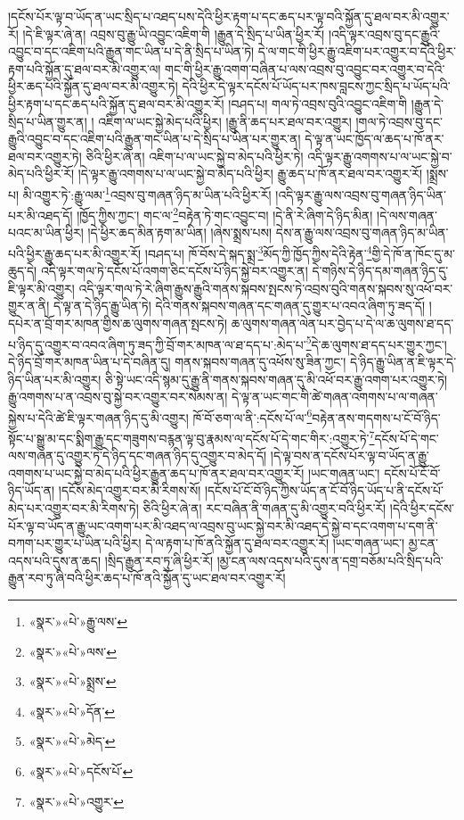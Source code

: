 །དངོས་པོར་ལྟ་བ་ཡོད་ན་ཡང་སྲིད་པ་འཐད་པས་དེའི་ཕྱིར་རྟག་པ་དང་ཆད་པར་ལྟ་བའི་སྐྱོན་དུ་ཐལ་བར་མི་འགྱུར་རོ། །དེ་ཇི་ལྟར་ཞེ་ན། འབྲས་བུ་རྒྱུ་ཡི་འབྱུང་འཇིག་གི །རྒྱུན་དེ་སྲིད་པ་ཡིན་ཕྱིར་རོ། །འདི་ལྟར་འབྲས་བུ་དང་རྒྱུའི་འབྱུང་བ་དང་འཇིག་པའི་རྒྱུན་གང་ཡིན་པ་དེ་ནི་སྲིད་པ་ཡིན་ཏེ། དེ་ལ་གང་གི་ཕྱིར་རྒྱུ་འཇིག་པར་འགྱུར་བ་དེའི་ཕྱིར་རྟག་པའི་སྐྱོན་དུ་ཐལ་བར་མི་འགྱུར་ལ། གང་གི་ཕྱིར་རྒྱུ་འགག་བཞིན་པ་ལས་འབྲས་བུ་འབྱུང་བར་འགྱུར་བ་དེའི་ཕྱིར་ཆད་པའི་སྐྱོན་དུ་ཐལ་བར་མི་འགྱུར་ཏེ། དེའི་ཕྱིར་དེ་ལྟར་དངོས་པོ་ཡོད་པར་ཁས་བླངས་ཀྱང་སྲིད་པ་ཡོད་པའི་ཕྱིར་རྟག་པ་དང་ཆད་པའི་སྐྱོན་དུ་ཐལ་བར་མི་འགྱུར་རོ། །བཤད་པ། གལ་ཏེ་འབྲས་བུའི་འབྱུང་འཇིག་གི །རྒྱུན་དེ་སྲིད་པ་ཡིན་གྱུར་ན། །
འཇིག་ལ་ཡང་སྐྱེ་མེད་པའི་ཕྱིར། །རྒྱུ་ནི་ཆད་པར་ཐལ་བར་འགྱུར། །གལ་ཏེ་འབྲས་བུ་དང་རྒྱུའི་འབྱུང་བ་དང་འཇིག་པའི་རྒྱུན་གང་ཡིན་པ་དེ་སྲིད་པ་ཡིན་པར་གྱུར་ན། དེ་ལྟ་ན་ཡང་ཁྱོད་ལ་ཆད་པ་ཁོ་ནར་ཐལ་བར་འགྱུར་ཏེ། ཅིའི་ཕྱིར་ཞེ་ན། འཇིག་པ་ལ་ཡང་སྐྱེ་བ་མེད་པའི་ཕྱིར་ཏེ། འདི་ལྟར་རྒྱུ་འགགས་པ་ལ་ཡང་སྐྱེ་བ་མེད་པའི་ཕྱིར་རོ། །དེ་ལྟར་རྒྱུ་འགགས་པ་ལ་ཡང་སྐྱེ་བ་མེད་པའི་ཕྱིར། རྒྱུ་ཆད་པ་ཁོ་ནར་ཐལ་བར་འགྱུར་རོ། །སྨྲས་པ། མི་འགྱུར་ཏེ་:རྒྱུ་ལམ་\footnote{«སྣར་»«པེ་»རྒྱུ་ལས་}འབྲས་བུ་གཞན་ཉིད་མ་ཡིན་པའི་ཕྱིར་རོ། །འདི་ལྟར་རྒྱུ་ལས་འབྲས་བུ་གཞན་ཉིད་ཡིན་པར་མི་འཐད་དོ། །ཁྱོད་ཀྱིས་ཀྱང་། གང་ལ་\footnote{«སྣར་»«པེ་»ལས་}བརྟེན་ཏེ་གང་འབྱུང་བ། །དེ་ནི་རེ་ཞིག་དེ་ཉིད་མིན། །དེ་ལས་གཞན་པའང་མ་ཡིན་ཕྱིར། །དེ་ཕྱིར་ཆད་མིན་རྟག་མ་ཡིན། །ཞེས་སྨྲས་པས། དེས་ན་རྒྱུ་ལས་འབྲས་བུ་གཞན་ཉིད་མ་ཡིན་པའི་ཕྱིར་རྒྱུ་ཆད་པར་མི་འགྱུར་རོ། །བཤད་པ། ཁོ་བོས་དེ་སྐད་སྨྲ་\footnote{«སྣར་»«པེ་»སྨྲས་}མོད་ཀྱི་ཁྱོད་ཀྱིས་དེའི་རྟེན་\footnote{«སྣར་»«པེ་»དོན་}གྱི་དེ་ཁོ་ན་ཁོང་དུ་མ་ཆུད་དེ། འདི་ལྟར་གལ་ཏེ་དངོས་པོ་འགག་ཅིང་དངོས་པོ་ཉིད་སྐྱེ་བར་འགྱུར་ན། དེ་གཉིས་དེ་ཉིད་དམ་གཞན་ཉིད་དུ་ཇི་ལྟར་མི་འགྱུར། འདི་ལྟར་གལ་ཏེ་རེ་ཞིག་རྒྱུས་རྒྱུའི་གནས་སྐབས་སྤངས་ཏེ་འབྲས་བུའི་གནས་སྐབས་སུ་འཕོ་བར་གྱུར་ན་ནི། དེ་ལྟ་ན་དེ་ཉིད་རྒྱུ་ཡིན་ཏེ། དེའི་གནས་སྐབས་གཞན་དང་གཞན་དུ་གྱུར་པ་འབའ་ཞིག་ཏུ་ཟད་དོ། །དཔེར་ན་བྲོ་གར་མཁན་གྱིས་ཆ་ལུགས་གཞན་སྤངས་ཏེ། ཆ་ལུགས་གཞན་ལེན་པར་བྱེད་པ་དེ་ལ་ཆ་ལུགས་ཐ་དད་པ་ཉིད་དུ་འགྱུར་བ་འབའ་ཞིག་ཏུ་ཟད་ཀྱི་བྲོ་གར་མཁན་ལ་ཐ་དད་པ་:མེད་པ་\footnote{«སྣར་»«པེ་»མེད་}དེ་ཆ་ལུགས་ཐ་དད་པར་གྱུར་ཀྱང་། དེ་ཉིད་བྲོ་གར་མཁན་ཡིན་པ་དེ་བཞིན་དུ། གནས་སྐབས་གཞན་དུ་འཕོས་སུ་ཟིན་ཀྱང་། དེ་ཉིད་རྒྱུ་ཡིན་ན་ཇི་ལྟར་དེ་ཉིད་ཡིན་པར་མི་འགྱུར། ཅི་སྟེ་ཡང་འདི་སྙམ་དུ་རྒྱུ་ནི་གནས་སྐབས་གཞན་དུ་མི་འཕོ་བར་རྒྱུ་འགག་པར་འགྱུར་ཏེ། རྒྱུ་འགགས་པ་ན་འབྲས་བུ་སྐྱེ་བར་འགྱུར་བར་སེམས་ན། དེ་ལྟ་ན་ཡང་གང་གི་ཚེ་གཞན་འགགས་པ་ལ་གཞན་སྐྱེས་པ་དེའི་ཚེ་ཇི་ལྟར་གཞན་ཉིད་དུ་མི་འགྱུར། ཁོ་བོ་ཅག་ལ་ནི་:དངོས་པོ་ལ་\footnote{«སྣར་»«པེ་»དངོས་པོ་}བརྟེན་ནས་གདགས་པ་ངོ་བོ་ཉིད་སྟོང་པ་སྒྱུ་མ་དང་སྨིག་རྒྱུ་དང་གཟུགས་བརྙན་ལྟ་བུ་རྣམས་ལ་དངོས་པོ་དེ་གང་གིར་:འགྱུར་ཏེ་\footnote{«སྣར་»«པེ་»འགྱུར་}དངོས་པོ་དེ་གང་ལས་གཞན་དུ་འགྱུར་ཏེ་དེ་ཉིད་དང་གཞན་ཉིད་དུ་འགྱུར་བ་མེད་དོ། །དེ་ལྟ་བས་ན་དངོས་པོར་ལྟ་བ་ཡོད་ན་རྒྱུ་འགགས་པ་ཡང་སྐྱེ་བ་མེད་པའི་ཕྱིར་རྒྱུན་ཆད་པ་ཁོ་ནར་ཐལ་བར་འགྱུར་རོ། །ཡང་གཞན་ཡང་། དངོས་པོ་ངོ་བོ་ཉིད་ཡོད་ན། །དངོས་མེད་འགྱུར་བར་མི་རིགས་སོ། །དངོས་པོ་ངོ་བོ་ཉིད་ཀྱིས་ཡོད་ན་ངོ་བོ་ཉིད་ཡོད་པ་ནི་དངོས་པོ་མེད་པར་འགྱུར་བར་མི་རིགས་ཏེ། ཅིའི་ཕྱིར་ཞེ་ན། རང་བཞིན་ནི་གཞན་དུ་མི་འགྱུར་བའི་ཕྱིར་རོ། །དེའི་ཕྱིར་དངོས་པོར་ལྟ་བ་ཡོད་ན་རྒྱུ་ཡང་འགག་པར་མི་འཐད་ལ་འབྲས་བུ་ཡང་སྐྱེ་བར་མི་འཐད་དེ་སྐྱེ་བ་དང་འགག་པ་དག་ནི་བཀག་པར་གྱུར་པ་ཡིན་པའི་ཕྱིར། དེ་ལ་རྟག་པ་ཁོ་ནའི་སྐྱོན་དུ་ཐལ་བར་འགྱུར་རོ། །ཡང་གཞན་ཡང་། མྱ་ངན་འདས་པའི་དུས་ན་ཆད། །སྲིད་རྒྱུན་རབ་ཏུ་ཞི་ཕྱིར་རོ། །མྱ་ངན་ལས་འདས་པའི་དུས་ན་དགྲ་བཅོམ་པའི་སྲིད་པའི་རྒྱུན་རབ་ཏུ་ཞི་བའི་ཕྱིར་ཆད་པ་ཁོ་ནའི་སྐྱོན་དུ་ཡང་ཐལ་བར་འགྱུར་རོ། 